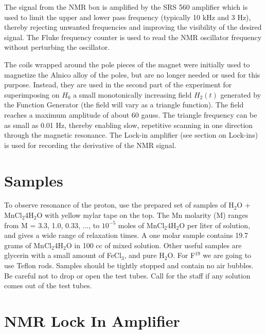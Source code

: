 \documentclass{../lab}
\begin{document}
The signal from the NMR box is amplified by the SRS 560 amplifier which is used to limit the upper and lower pass frequency (typically 10 kHz and 3 Hz), thereby rejecting unwanted frequencies and improving the visibility of the desired signal. The Fluke frequency counter is used to read the NMR oscillator frequency without perturbing the oscillator.

The coils wrapped around the pole pieces of the magnet were initially used to magnetize the Alnico alloy of the poles, but are no longer needed or used for this purpose. Instead, they are used in the second part of the experiment for superimposing on $H_0$ a small monotonically increasing field $H_2(t)$ generated by the Function Generator (the field will vary as a triangle function). The field reaches a maximum amplitude of about 60 gauss. The triangle frequency can be as small as 0.01 Hz, thereby enabling slow, repetitive scanning in one direction through the magnetic resonance. The Lock-in amplifier (see section on Lock-ins) is used for recording the derivative of the NMR signal.

\section{Samples}



To observe resonance of the proton, use the prepared set of samples of H$_2$O + MnCl$_2$4H$_2$O with yellow mylar tape on the top. The Mn molarity (M) ranges from M = 3.3, 1.0, 0.33, ..., to $10^{-5}$ moles of MnCl$_2$4H$_2$O per liter of solution, and gives a wide range of relaxation times. A one molar sample contains 19.7 grams of MnCl$_2$4H$_2$O in 100 cc of mixed solution. Other useful samples are glycerin with a small amount of FeCl$_3$, and pure H$_2$O. For F$^{19}$ we are going to use Teflon rods. Samples should be tightly stopped and contain no air bubbles. Be careful not to drop or open the test tubes. Call for the staff if any solution comes out of the test tubes.

\section{NMR Lock In Amplifier}
\end{document}
